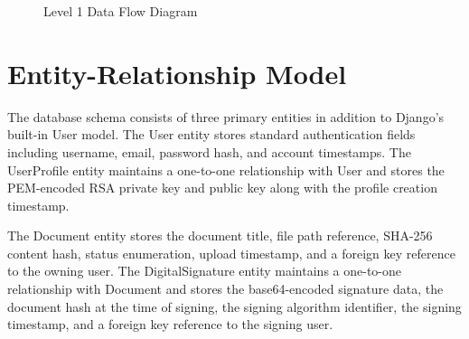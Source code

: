 \begin{figure}[H]
\centering
{}
\caption{Level 1 Data Flow Diagram}
\label{fig:dfd1}
\end{figure}

\section{Entity-Relationship Model}

The database schema consists of three primary entities in addition to Django's built-in User model. The User entity stores standard authentication fields including username, email, password hash, and account timestamps. The UserProfile entity maintains a one-to-one relationship with User and stores the PEM-encoded RSA private key and public key along with the profile creation timestamp.

The Document entity stores the document title, file path reference, SHA-256 content hash, status enumeration, upload timestamp, and a foreign key reference to the owning user. The DigitalSignature entity maintains a one-to-one relationship with Document and stores the base64-encoded signature data, the document hash at the time of signing, the signing algorithm identifier, the signing timestamp, and a foreign key reference to the signing user.

